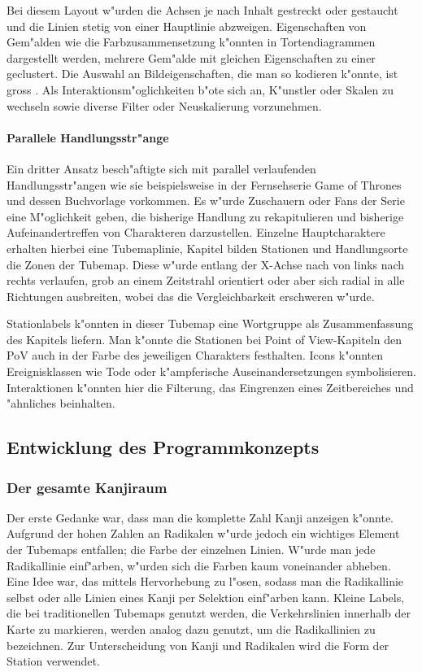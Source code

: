 Bei diesem Layout w"urden die Achsen je nach Inhalt gestreckt oder gestaucht und die Linien stetig von einer Hauptlinie abzweigen. Eigenschaften von Gem"alden wie die Farbzusammensetzung k"onnten in Tortendiagrammen dargestellt werden, mehrere Gem"alde mit gleichen Eigenschaften zu einer geclustert. Die Auswahl an Bildeigenschaften, die man so kodieren k"onnte, ist gross . Als Interaktionsm"oglichkeiten b"ote sich an, K"unstler oder Skalen zu wechseln sowie diverse Filter oder Neuskalierung vorzunehmen. 

\paragraph{Parallele Handlungsstr"ange}
Ein dritter Ansatz besch"aftigte sich mit parallel verlaufenden Handlungsstr"angen wie sie beispielsweise in der Fernsehserie Game of Thrones und dessen Buchvorlage vorkommen. Es w"urde Zuschauern oder Fans der Serie eine M"oglichkeit geben, die bisherige Handlung zu rekapitulieren und bisherige Aufeinandertreffen von Charakteren darzustellen. Einzelne Hauptcharaktere erhalten hierbei eine Tubemaplinie, Kapitel bilden Stationen und Handlungsorte die Zonen der Tubemap. Diese w"urde entlang der X-Achse nach von links nach rechts verlaufen, grob an einem Zeitstrahl orientiert oder aber sich radial in alle Richtungen ausbreiten, wobei das die Vergleichbarkeit erschweren w"urde.

Stationlabels k"onnten in dieser Tubemap eine Wortgruppe als Zusammenfassung des Kapitels liefern. Man k"onnte die Stationen bei Point of View-Kapiteln den PoV auch in der Farbe des jeweiligen Charakters festhalten. Icons k"onnten Ereignisklassen wie Tode oder k"ampferische Auseinandersetzungen symbolisieren. Interaktionen k"onnten hier die Filterung, das Eingrenzen eines Zeitbereiches und "ahnliches beinhalten. 


\subsection{Entwicklung des Programmkonzepts}
\subsubsection{Der gesamte Kanjiraum}
Der erste Gedanke war, dass man die komplette Zahl Kanji anzeigen k"onnte. Aufgrund der hohen Zahlen an Radikalen w"urde jedoch ein wichtiges Element der Tubemaps entfallen; die Farbe der einzelnen Linien. W"urde man jede Radikallinie einf"arben, w"urden sich die Farben kaum voneinander abheben. Eine Idee war, das mittels Hervorhebung zu l"osen, sodass man die Radikallinie selbst oder alle Linien eines Kanji per Selektion einf"arben kann. Kleine Labels, die bei traditionellen Tubemaps genutzt werden, die Verkehrslinien innerhalb der Karte zu markieren, werden analog dazu genutzt, um die Radikallinien zu bezeichnen. Zur Unterscheidung von Kanji und Radikalen wird die Form der Station verwendet.

